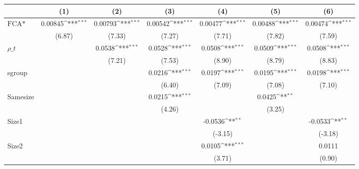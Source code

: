 {
\def\sym#1{\ifmmode^{#1}\else\(^{#1}\)\fi}
\begin{tabular}{l*{6}{c}}
\hline\hline
                    &\multicolumn{1}{c}{(1)}         &\multicolumn{1}{c}{(2)}         &\multicolumn{1}{c}{(3)}         &\multicolumn{1}{c}{(4)}         &\multicolumn{1}{c}{(5)}         &\multicolumn{1}{c}{(6)}         \\
\hline
$ \text{FCA*} $     &     0.00845\sym{***}&     0.00793\sym{***}&     0.00542\sym{***}&     0.00477\sym{***}&     0.00488\sym{***}&     0.00474\sym{***}\\
                    &      (6.87)         &      (7.33)         &      (7.27)         &      (7.71)         &      (7.82)         &      (7.59)         \\
[1em]
 $ \rho\_t $         &                     &      0.0538\sym{***}&      0.0528\sym{***}&      0.0508\sym{***}&      0.0509\sym{***}&      0.0508\sym{***}\\
                    &                     &      (7.21)         &      (7.53)         &      (8.90)         &      (8.79)         &      (8.83)         \\
[1em]
sgroup              &                     &                     &      0.0216\sym{***}&      0.0197\sym{***}&      0.0195\sym{***}&      0.0198\sym{***}\\
                    &                     &                     &      (6.40)         &      (7.09)         &      (7.08)         &      (7.10)         \\
[1em]
Samesize            &                     &                     &      0.0215\sym{***}&                     &      0.0425\sym{**} &                     \\
                    &                     &                     &      (4.26)         &                     &      (3.25)         &                     \\
[1em]
Size1               &                     &                     &                     &     -0.0536\sym{**} &                     &     -0.0533\sym{**} \\
                    &                     &                     &                     &     (-3.15)         &                     &     (-3.18)         \\
[1em]
Size2               &                     &                     &                     &      0.0105\sym{***}&                     &      0.0111         \\
                    &                     &                     &                     &      (3.71)         &                     &      (0.90)         \\

\end{tabular}}
